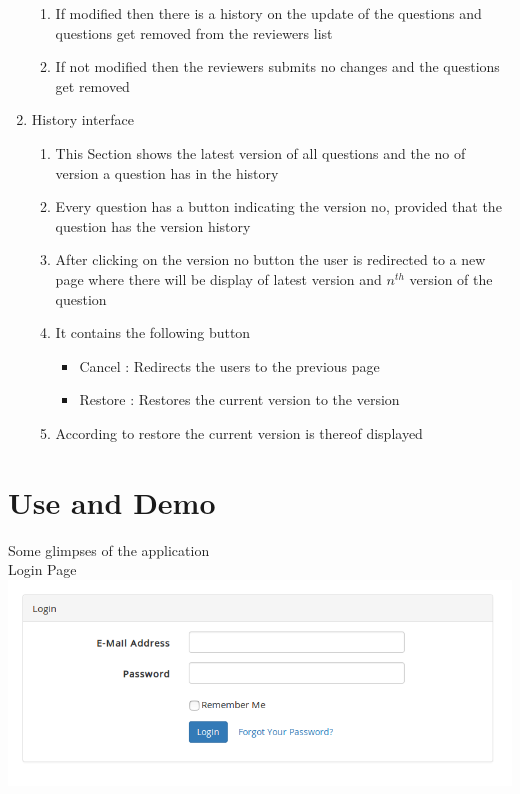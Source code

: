 \documentclass[a4paper,12pt,oneside]{book}
\begin{document}
\begin{enumerate}
\begin{enumerate}
            \item If modified then there is a history on the update of the questions and questions get removed from the reviewers list
            \item  If not modified then the reviewers submits no changes and the questions get removed
            \end{enumerate}
            
        \item History interface
            \begin{enumerate}
            \item This Section shows the latest version of all questions and the no of version a question has in the history
            \item Every question has a button indicating the version no, provided that the question has the version history
            \item After clicking on the version no button the user is redirected to a new page where there will be display of latest version and \(n^{th}\) version of the question
            \item It contains the following button
                            \begin{itemize}
                                \item Cancel : Redirects the users to the previous page
                                \item Restore : Restores the current version to the  version
                            \end{itemize}
           
            \item According to restore the current version is thereof displayed
            \end{enumerate}
    \end{enumerate}

\vspace{2in}
\section{Use and Demo}
Some glimpses of the application\\
Login Page \\
\includegraphics[scale=0.5]{login.png} \\
\end{document}
